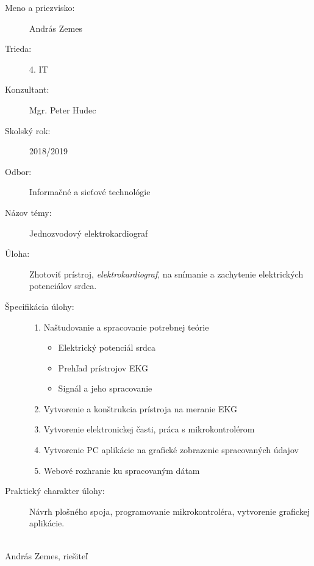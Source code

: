 \documentclass[titlepage]{article}
\begin{document}
\begin{description}
	\item [Meno a priezvisko:]
		\tabto{4cm} András Zemes
		
    \item [Trieda:]	
    	\tabto{4cm} 4. IT
    	
	\item [Konzultant:]		 	  
		\tabto{4cm} Mgr. Peter Hudec
		
	\item [Skolský rok:] 
		\tabto{4cm} 2018/2019
		
	\item [Odbor:]		  
		\tabto{4cm} Informačné a sieťové technológie
		
	\item [Názov témy:]			  
		\tabto{4cm} Jednozvodový elektrokardiograf 
		
	\item [Úloha:]				  
		\tabto{4cm} Zhotoviť prístroj, \emph{elektrokardiograf}, na snímanie 
		\tabto{4cm} a zachytenie elektrických potenciálov srdca.
		
	\item [Špecifikácia úlohy:] \hfill
	
    \begin{enumerate}
		\item Naštudovanie a spracovanie potrebnej teórie
		\begin{itemize}
			\item Elektrický potenciál srdca
        	\item Prehľad prístrojov EKG
        	\item Signál a jeho spracovanie
		\end{itemize}
    	\item Vytvorenie a konštrukcia prístroja na meranie EKG
    	\item Vytvorenie elektronickej časti, práca s mikrokontrolérom
    	\item Vytvorenie PC aplikácie na grafické zobrazenie spracovaných údajov
    	\item Webové rozhranie ku spracovaným dátam
	\end{enumerate}
	
	\item [Praktický charakter úlohy:]
		Návrh plošného spoja, programovanie 
		\tabto{4cm} mikrokontroléra, vytvorenie grafickej aplikácie.
		
\end{description}
	
\vspace{10mm}
\hrulefill
\\\hspace*{0mm}\phantom{v.r.: }András Zemes, riešiteľ
\end{document}
